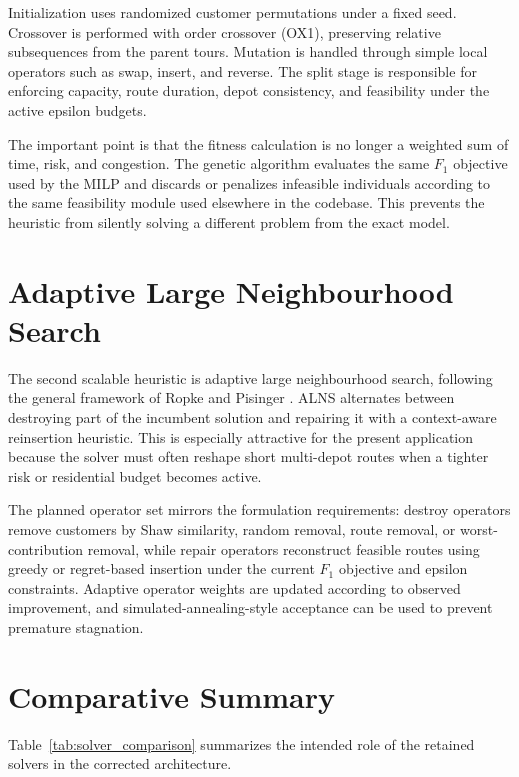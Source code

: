 Initialization uses randomized customer permutations under a fixed seed. Crossover is performed with order crossover (OX1), preserving relative subsequences from the parent tours. Mutation is handled through simple local operators such as swap, insert, and reverse. The split stage is responsible for enforcing capacity, route duration, depot consistency, and feasibility under the active epsilon budgets.

The important point is that the fitness calculation is no longer a weighted sum of time, risk, and congestion. The genetic algorithm evaluates the same $F_1$ objective used by the MILP and discards or penalizes infeasible individuals according to the same feasibility module used elsewhere in the codebase. This prevents the heuristic from silently solving a different problem from the exact model.

\section{Adaptive Large Neighbourhood Search}

The second scalable heuristic is adaptive large neighbourhood search, following the general framework of Ropke and Pisinger \citep{ropke2006}. ALNS alternates between destroying part of the incumbent solution and repairing it with a context-aware reinsertion heuristic. This is especially attractive for the present application because the solver must often reshape short multi-depot routes when a tighter risk or residential budget becomes active.

The planned operator set mirrors the formulation requirements: destroy operators remove customers by Shaw similarity, random removal, route removal, or worst-contribution removal, while repair operators reconstruct feasible routes using greedy or regret-based insertion under the current $F_1$ objective and epsilon constraints. Adaptive operator weights are updated according to observed improvement, and simulated-annealing-style acceptance can be used to prevent premature stagnation.

\section{Comparative Summary}

Table~\ref{tab:solver_comparison} summarizes the intended role of the retained solvers in the corrected architecture.

